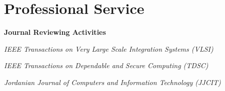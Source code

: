 \section*{Professional Service}
\begin{description}
\item \textbf{Journal Reviewing Activities}
\item \emph{IEEE Transactions on Very Large Scale Integration Systems (VLSI)} 
\item \emph{IEEE Transactions on Dependable and Secure Computing (TDSC)} 
\item \emph{Jordanian Journal of Computers and Information Technology (JJCIT)} 
\end{description}
